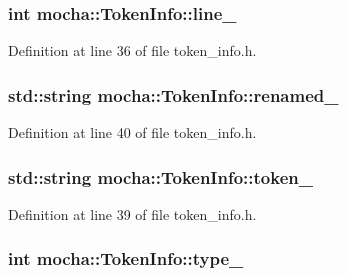 \hypertarget{classmocha_1_1_token_info_a507eaae686fcf08cb5504117ce660a1b}{
\subsubsection[{line\_\-}]{\setlength{\rightskip}{0pt plus 5cm}int {\bf mocha::TokenInfo::line\_\-}}}
\label{classmocha_1_1_token_info_a507eaae686fcf08cb5504117ce660a1b}


Definition at line 36 of file token\_\-info.h.

\hypertarget{classmocha_1_1_token_info_af154824b9fca9aec8c462d6d3bb74c56}{
\subsubsection[{renamed\_\-}]{\setlength{\rightskip}{0pt plus 5cm}std::string {\bf mocha::TokenInfo::renamed\_\-}}}
\label{classmocha_1_1_token_info_af154824b9fca9aec8c462d6d3bb74c56}


Definition at line 40 of file token\_\-info.h.

\hypertarget{classmocha_1_1_token_info_ae8fb5a3f94285db1e14ddd222d874166}{
\subsubsection[{token\_\-}]{\setlength{\rightskip}{0pt plus 5cm}std::string {\bf mocha::TokenInfo::token\_\-}}}
\label{classmocha_1_1_token_info_ae8fb5a3f94285db1e14ddd222d874166}


Definition at line 39 of file token\_\-info.h.

\hypertarget{classmocha_1_1_token_info_a20cafafc8e332f6182184b70fe147c2c}{
\subsubsection[{type\_\-}]{\setlength{\rightskip}{0pt plus 5cm}int {\bf mocha::TokenInfo::type\_\-}}}
\label{classmocha_1_1_token_info_a20cafafc8e332f6182184b70fe147c2c}


